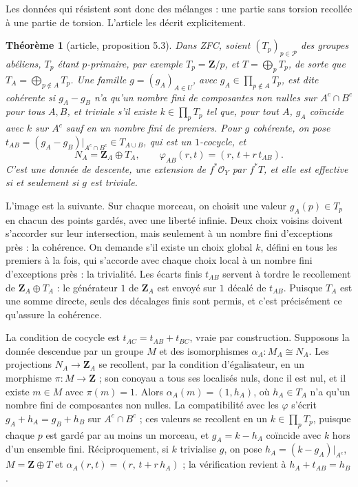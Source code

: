 \documentclass[11pt,a4paper]{amsart}
\theoremstyle{definition}
\theoremstyle{plain}
\newtheorem{theoreme}{Théorème}
\theoremstyle{remark}
\newcommand{\Z}{\mathbf Z}
\newcommand{\Pp}{\mathcal P}
\begin{document}
Les données qui résistent sont donc des mélanges : une partie sans torsion recollée à une partie de torsion. L'article les décrit explicitement.

\begin{theoreme}[article, proposition 5.3]
Dans ZFC, soient $(T_p)_{p\in\Pp}$ des groupes abéliens, $T_p$ étant $p$-primaire, par exemple $T_p=\Z/p$, et $T=\bigoplus_pT_p$, de sorte que $T_A=\bigoplus_{p\notin A}T_p$. Une famille $g=(g_A)_{A\in U}$, avec $g_A\in\prod_{p\notin A}T_p$, est dite \emph{cohérente} si $g_A-g_B$ n'a qu'un nombre fini de composantes non nulles sur $A^c\cap B^c$ pour tous $A,B$, et \emph{triviale} s'il existe $k\in\prod_pT_p$ tel que, pour tout $A$, $g_A$ coïncide avec $k$ sur $A^c$ sauf en un nombre fini de premiers. Pour $g$ cohérente, on pose $t_{AB}=(g_A-g_B)|_{A^c\cap B^c}\in T_{A\cup B}$, qui est un $1$-cocycle, et
\[
N_A=\Z_A\oplus T_A,\qquad\varphi_{AB}(r,t)=(r,\,t+r\,t_{AB}).
\]
C'est une donnée de descente, une extension de $f^*\mathcal O_Y$ par $f^*T$, et elle est effective si et seulement si $g$ est triviale.
\end{theoreme}

L'image est la suivante. Sur chaque morceau, on choisit une valeur $g_A(p)\in T_p$ en chacun des points gardés, avec une liberté infinie. Deux choix voisins doivent s'accorder sur leur intersection, mais seulement à un nombre fini d'exceptions près : la cohérence. On demande s'il existe un choix global $k$, défini en tous les premiers à la fois, qui s'accorde avec chaque choix local à un nombre fini d'exceptions près : la trivialité. Les écarts finis $t_{AB}$ servent à tordre le recollement de $\Z_A\oplus T_A$ : le générateur $1$ de $\Z_A$ est envoyé sur $1$ décalé de $t_{AB}$. Puisque $T_A$ est une somme directe, seuls des décalages finis sont permis, et c'est précisément ce qu'assure la cohérence.

La condition de cocycle est $t_{AC}=t_{AB}+t_{BC}$, vraie par construction. Supposons la donnée descendue par un groupe $M$ et des isomorphismes $\alpha_A\colon M_A\cong N_A$. Les projections $N_A\to\Z_A$ se recollent, par la condition d'égalisateur, en un morphisme $\pi\colon M\to\Z$ ; son conoyau a tous ses localisés nuls, donc il est nul, et il existe $m\in M$ avec $\pi(m)=1$. Alors $\alpha_A(m)=(1,h_A)$, où $h_A\in T_A$ n'a qu'un nombre fini de composantes non nulles. La compatibilité avec les $\varphi$ s'écrit $g_A+h_A=g_B+h_B$ sur $A^c\cap B^c$ ; ces valeurs se recollent en un $k\in\prod_pT_p$, puisque chaque $p$ est gardé par au moins un morceau, et $g_A=k-h_A$ coïncide avec $k$ hors d'un ensemble fini. Réciproquement, si $k$ trivialise $g$, on pose $h_A=(k-g_A)|_{A^c}$, $M=\Z\oplus T$ et $\alpha_A(r,t)=(r,\,t+r\,h_A)$ ; la vérification revient à $h_A+t_{AB}=h_B$.
\end{document}
